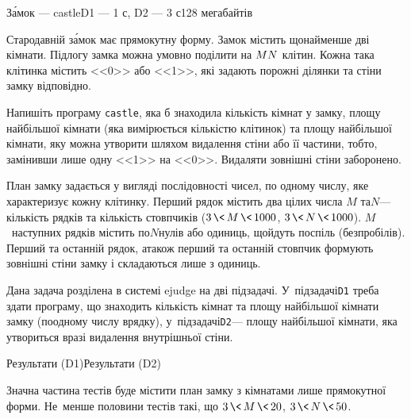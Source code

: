 \begin{problem}{З\'{а}мок --- castle}{\stdinOrInputTxt}{\stdoutOrOutputTxt}{D1 --- 1 с, D2 --- 3 с}{128 мегабайтів}


Стародавній з\'{а}мок має прямокутну форму. Замок містить щонайменше дві кімнати. Підлогу замка можна умовно поділити на $M{\*}N$ клітин. Кожна така клітинка містить <<0>> або <<1>>, які задають порожні ділянки та стіни замку відповідно.

\Task Напишіть програму \texttt{castle}, яка б знаходила кількість кімнат у зам\-ку, площу найбільшої кімнати (яка вимірюється кількістю клітинок) та площу найбільшої кімнати, яку можна утворити шляхом видалення стіни або її частини, тобто, замінивши лише одну <<1>> на <<0>>. Видаляти зовнішні стіни заборонено.

\InputFile План замку задається у вигляді послідовності чисел, по одному числу, яке характеризує кожну клітинку. Перший рядок містить два цілих числа $M$ та\nolinebreak[2] $N$\nolinebreak[3] --- кількість рядків та кількість стовпчиків (${3\,{\<}\,M\,{\<}\,1000}$, ${3\,{\<}\,N\,{\<}\,1000}$). $M$~наступних рядків містить по\nolinebreak[3] $N$\nolinebreak[3] нулів або одиниць, що\nolinebreak[3] йдуть поспіль (без\nolinebreak[2] пробілів). Перший та останній рядок, а\nolinebreak[3] також перший та останній стовпчик формують зовнішні стіни замку і складаються лише з одиниць.

\OutputFile Дана задача розділена в системі ejudge на дві підзадачі. У~підзадачі\nolinebreak[3] \texttt{D1} треба здати програму, що знаходить кількість кімнат та площу найбільшої кімнати замку (по\nolinebreak[3] одному числу в\nolinebreak[3] рядку), у~підзадачі\nolinebreak[2] \texttt{D2}\nolinebreak[3] --- площу найбільшої кімнати, яка утвориться в\nolinebreak[3] разі видалення внутрішньої стіни.\pagebreak[1]




\ifAfour\else\noindent\fi
\Examples

\ifAfour
\vspace{-2.25\baselineskip}
\else
\vspace{-1.25\baselineskip}
\fi

{\makeTableLongtrue %
\begin{exampleSimpleThreeWithSpecNameColTwo}{7em}{3em}{3em}{Результати (D1)}{Результати (D2)}%
%
%
\end{exampleSimpleThreeWithSpecNameColTwo}}

\Scoring Значна частина тестів буде містити план замку з кімнатами лише прямокутної форми. Не~менше половини тестів такі, що ${3\,{\<}\,M\,{\<}\,20}$, ${3\,{\<}\,N\,{\<}\,50}$.

\end{problem}

